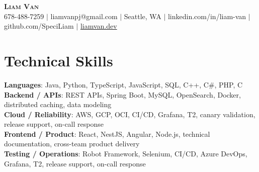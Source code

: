 \documentclass[letterpaper,11pt]{article}
\begin{document}

%
\begin{center}
    \textbf{\Huge \scshape Liam Van} \\ \vspace{1pt}
    \small 678-488-7259 $|$ liamvanpj@gmail.com $|$ Seattle, WA $|$
    linkedin.com/in/liam-van $|$ github.com/SpeciLiam $|$ \href{https://liamvan.dev}{liamvan.dev}

\end{center}

\section{Technical Skills}
 \begin{itemize}[leftmargin=0.15in, label={}]
    \small{\item{
     \textbf{Languages}{: Java, Python, TypeScript, JavaScript, SQL, C++, C\#, PHP, C} \\
     \textbf{Backend / APIs}{: REST APIs, Spring Boot, MySQL, OpenSearch, Docker, distributed caching, data modeling} \\
     \textbf{Cloud / Reliability}{: AWS, GCP, OCI, CI/CD, Grafana, T2, canary validation, release support, on-call response} \\
     \textbf{Frontend / Product}{: React, NestJS, Angular, Node.js, technical documentation, cross-team product delivery} \\
     \textbf{Testing / Operations}{: Robot Framework, Selenium, CI/CD, Azure DevOps, Grafana, T2, release support, on-call response} \\
    }}
 \end{itemize}
%
\end{document}
